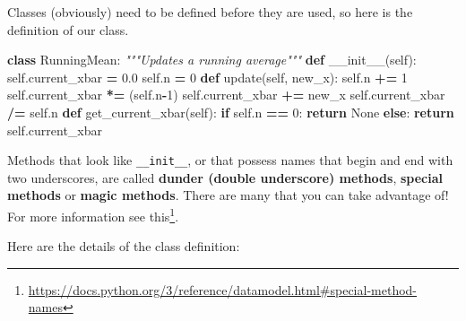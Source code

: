 \documentclass[
  12pt,
  krantz2]{krantz}
\makeatletter
\newenvironment{Shaded}{\begin{snugshade}}{\end{snugshade}}
\newcommand{\CommentTok}[1]{\textcolor[rgb]{0.37,0.37,0.37}{\textit{#1}}}
\newcommand{\ControlFlowTok}[1]{\textcolor[rgb]{0.27,0.27,0.27}{\textbf{#1}}}
\newcommand{\DecValTok}[1]{\textcolor[rgb]{0.06,0.06,0.06}{#1}}
\newcommand{\FloatTok}[1]{\textcolor[rgb]{0.06,0.06,0.06}{#1}}
\newcommand{\FunctionTok}[1]{\textcolor[rgb]{0,0,0}{#1}}
\newcommand{\KeywordTok}[1]{\textcolor[rgb]{0.27,0.27,0.27}{\textbf{#1}}}
\newcommand{\NormalTok}[1]{#1}
\newcommand{\OperatorTok}[1]{\textcolor[rgb]{0.43,0.43,0.43}{\textbf{#1}}}
\newcommand{\VariableTok}[1]{\textcolor[rgb]{0,0,0}{#1}}
\renewcommand{\href}[2]{#2\footnote{\url{#1}}}
\newenvironment{kframe}{%
\medskip{}
\setlength{\fboxsep}{.8em}
 \def\at@end@of@kframe{}%
 \ifinner\ifhmode%
  \def\at@end@of@kframe{\end{minipage}}%
  \begin{minipage}{\columnwidth}%
 \fi\fi%
 \def\FrameCommand##1{\hskip\@totalleftmargin \hskip-\fboxsep
 \colorbox{shadecolor}{##1}\hskip-\fboxsep
     \hskip-\linewidth \hskip-\@totalleftmargin \hskip\columnwidth}%
 \MakeFramed {\advance\hsize-\width
   \@totalleftmargin\z@ \linewidth\hsize
   \@setminipage}}%
 {\par\unskip\endMakeFramed%
 \at@end@of@kframe}
\renewenvironment{Shaded}{\begin{kframe}}{\end{kframe}}
\makeatother
\begin{document}
Classes (obviously) need to be defined before they are used, so here is the definition of our class.

\begin{Shaded}
\begin{Highlighting}[]
\KeywordTok{class}\NormalTok{ RunningMean:}
    \CommentTok{"""Updates a running average"""}
    \KeywordTok{def} \FunctionTok{\_\_init\_\_}\NormalTok{(}\VariableTok{self}\NormalTok{):}
        \VariableTok{self}\NormalTok{.current\_xbar }\OperatorTok{=} \FloatTok{0.0}
        \VariableTok{self}\NormalTok{.n }\OperatorTok{=} \DecValTok{0}
    \KeywordTok{def}\NormalTok{ update(}\VariableTok{self}\NormalTok{, new\_x):}
        \VariableTok{self}\NormalTok{.n }\OperatorTok{+=} \DecValTok{1}
        \VariableTok{self}\NormalTok{.current\_xbar }\OperatorTok{*=}\NormalTok{ (}\VariableTok{self}\NormalTok{.n}\OperatorTok{{-}}\DecValTok{1}\NormalTok{)}
        \VariableTok{self}\NormalTok{.current\_xbar }\OperatorTok{+=}\NormalTok{ new\_x}
        \VariableTok{self}\NormalTok{.current\_xbar }\OperatorTok{/=} \VariableTok{self}\NormalTok{.n}
    \KeywordTok{def}\NormalTok{ get\_current\_xbar(}\VariableTok{self}\NormalTok{):}
        \ControlFlowTok{if} \VariableTok{self}\NormalTok{.n }\OperatorTok{==} \DecValTok{0}\NormalTok{:}
            \ControlFlowTok{return} \VariableTok{None}
        \ControlFlowTok{else}\NormalTok{:}
            \ControlFlowTok{return} \VariableTok{self}\NormalTok{.current\_xbar}
\end{Highlighting}
\end{Shaded}

\begin{rmd-details}
Methods that look like \texttt{\_\_init\_\_}, or that possess names that begin and end with two underscores, are called \textbf{dunder (double underscore) methods}, \textbf{special methods} or \textbf{magic methods}. There are many that you can take advantage of! For more information see \href{https://docs.python.org/3/reference/datamodel.html\#special-method-names}{this}.

\end{rmd-details}

Here are the details of the class definition:
\end{document}
